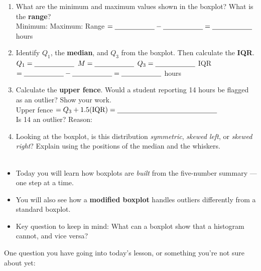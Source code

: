 \documentclass[10pt]{article}
\begin{document}
\begin{enumerate}[leftmargin=1.5em, itemsep=10pt]

  \item What are the minimum and maximum values shown in the boxplot?
        What is the \textbf{range}?\\[6pt]
        Minimum: \blank{2cm} \quad Maximum: \blank{2cm} \quad
        Range $= \blank{2cm} - \blank{2cm} = \blank{2cm}$ hours

  \item Identify $Q_1$, the \textbf{median}, and $Q_3$ from the boxplot.
        Then calculate the \textbf{IQR}.\\[6pt]
        $Q_1 = \blank{2cm}$ \quad $M = \blank{2cm}$ \quad $Q_3 = \blank{2cm}$
        \quad IQR $= \blank{2cm} - \blank{2cm} = \blank{2cm}$ hours

  \item Calculate the \textbf{upper fence}. Would a student reporting 14 hours
        be flagged as an outlier? Show your work.\\[6pt]
        Upper fence $= Q_3 + 1.5(\text{IQR}) = \blank{5cm}$\\[4pt]
        Is 14 an outlier? \blank{3cm} \quad Reason: \blank{6cm}

  \item Looking at the boxplot, is this distribution \textit{symmetric},
        \textit{skewed left}, or \textit{skewed right}? Explain using the
        positions of the median and the whiskers.\\[6pt]
        \writeline\\[1pt]\writeline

\end{enumerate}

\vspace{0.14in}

\begin{tcolorbox}[colback=greenbg, colframe=greenacc, boxrule=0.8pt, arc=2mm,
    left=4mm, right=4mm, top=3mm, bottom=3mm]
\small
\begin{itemize}[leftmargin=1.3em, itemsep=5pt]
  \item Today you will learn how boxplots are \textit{built} from the five-number
        summary --- one step at a time.
  \item You will also see how a \textbf{modified boxplot} handles outliers
        differently from a standard boxplot.
  \item Key question to keep in mind: What can a boxplot show that a histogram
        cannot, and vice versa?
\end{itemize}
\end{tcolorbox}

\vspace{0.12in}

\noindent\textcolor{slate}{\small One question you have going into today's lesson,
or something you're not sure about yet:}\\[8pt]
\writeline
\end{document}
